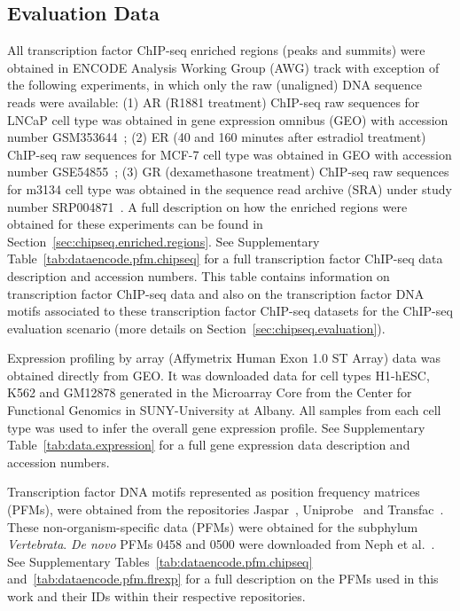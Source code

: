\subsection{Evaluation Data}
\label{sec:evaluation.data}

All transcription factor ChIP-seq enriched regions (peaks and summits) were obtained in ENCODE Analysis Working Group (AWG) track with exception of the following experiments, in which only the raw (unaligned) DNA sequence reads were available: (1) AR (R1881 treatment) ChIP-seq raw sequences for LNCaP cell type was obtained in gene expression omnibus (GEO) with accession number GSM353644~\cite{yu2010}; (2) ER (40 and 160 minutes after estradiol treatment) ChIP-seq raw sequences for MCF-7 cell type was obtained in GEO with accession number GSE54855~\cite{guertin2014}; (3) GR (dexamethasone treatment) ChIP-seq raw sequences for m3134 cell type was obtained in the sequence read archive (SRA) under study number SRP004871~\cite{john2011}. A full description on how the enriched regions were obtained for these experiments can be found in Section~\ref{sec:chipseq.enriched.regions}. See Supplementary Table~\ref{tab:dataencode.pfm.chipseq} for a full transcription factor ChIP-seq data description and accession numbers. This table contains information on transcription factor ChIP-seq data and also on the transcription factor DNA motifs associated to these transcription factor ChIP-seq datasets for the ChIP-seq evaluation scenario (more details on Section~\ref{sec:chipseq.evaluation}).

Expression profiling by array (Affymetrix Human Exon 1.0 ST Array) data was obtained directly from GEO. It was downloaded data for cell types H1-hESC, K562 and GM12878 generated in the Microarray Core from the Center for Functional Genomics in SUNY-University at Albany. All samples from each cell type was used to infer the overall gene expression profile. See Supplementary Table~\ref{tab:data.expression} for a full gene expression data description and accession numbers.

Transcription factor DNA motifs represented as position frequency matrices (PFMs), were obtained from the repositories Jaspar~\cite{mathelier2014}, Uniprobe~\cite{robasky2011} and Transfac~\cite{matys2006}. These non-organism-specific data (PFMs) were obtained for the subphylum \emph{Vertebrata}. \emph{De novo} PFMs 0458 and 0500 were downloaded from Neph et al.~\cite{neph2012a}. See Supplementary Tables~\ref{tab:dataencode.pfm.chipseq} and~\ref{tab:dataencode.pfm.flrexp} for a full description on the PFMs used in this work and their IDs within their respective repositories.

